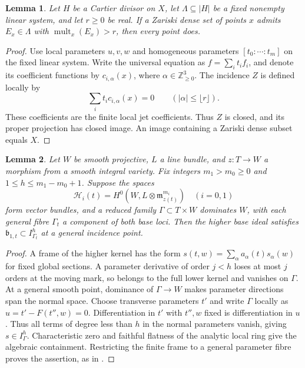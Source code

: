 \documentclass[12pt,a4paper,psamsfonts]{amsart}
\theoremstyle{definition}
\theoremstyle{plain}
\newtheorem{lemma}{Lemma}[section]
\newcommand{\mult}{\operatorname{mult}}
\begin{document}
\begin{lemma}\label{lem:hd-dense-multiplicity}
Let $H$ be a Cartier divisor on $X$, let
$\Lambda\subseteq|H|$ be a fixed nonempty linear system, and let
$r\ge0$ be real. If a Zariski dense set of points $x$ admits
$E_x\in\Lambda$ with $\mult_x(E_x)>r$, then every point does.
\end{lemma}
\begin{proof}
Use local parameters $u,v,w$ and homogeneous parameters
$[t_0:\cdots:t_m]$ on the fixed linear system. Write the universal
equation as $f=\sum_i t_i f_i$, and denote its coefficient functions
by $c_{i,\alpha}(x)$, where $\alpha\in\mathbb Z_{\ge0}^3$.
The incidence $Z$ is defined locally by
\[
 \sum_i t_i c_{i,\alpha}(x)=0\qquad(|\alpha|\le\lfloor r\rfloor).
\]
These coefficients are the finite local jet coefficients. Thus
$Z$ is closed, and its proper projection has closed image.
An image containing a Zariski dense subset equals $X$.

\end{proof}

\begin{lemma}\label{lem:jet-normal-containment}
Let $W$ be smooth projective, $L$ a line bundle, and $z:T\to W$
a morphism from a smooth integral variety. Fix integers
$m_1>m_0\ge0$ and $1\le h\le m_1-m_0+1$.
Suppose the spaces
\[
 \mathcal H_i(t)=H^0(W,L\otimes\mathfrak m_{z(t)}^{m_i})
 \quad(i=0,1)
\]
form vector bundles, and a reduced family $\Gamma\subset T\times W$
dominates $W$, with each general fibre $\Gamma_t$ a component of
both base loci. Then the higher base ideal satisfies
$\mathfrak b_{1,t}\subset I_{\Gamma_t}^{h}$ at a general incidence point.
\end{lemma}
\begin{proof}
A frame of the higher kernel has the form
$s(t,w)=\sum_\alpha a_\alpha(t)s_\alpha(w)$ for fixed global sections.
A parameter derivative of order $j<h$ loses at most $j$ orders
at the moving mark, so belongs to the full lower kernel and
vanishes on $\Gamma$.
At a general smooth point, dominance of $\Gamma\to W$ makes
parameter directions span the normal space. Choose transverse
parameters $t'$ and write $\Gamma$ locally as
$u=t'-F(t'',w)=0$. Differentiation in $t'$ with $t'',w$ fixed
is differentiation in $u$. Thus all terms of degree less than $h$
in the normal parameters vanish, giving $s\in I_\Gamma^h$.
Characteristic zero and faithful flatness of the analytic local
ring give the algebraic containment. Restricting the finite frame
to a general parameter fibre proves the assertion, as in
\cite[Lemma~7.3]{LA}.
\end{proof}
\end{document}
